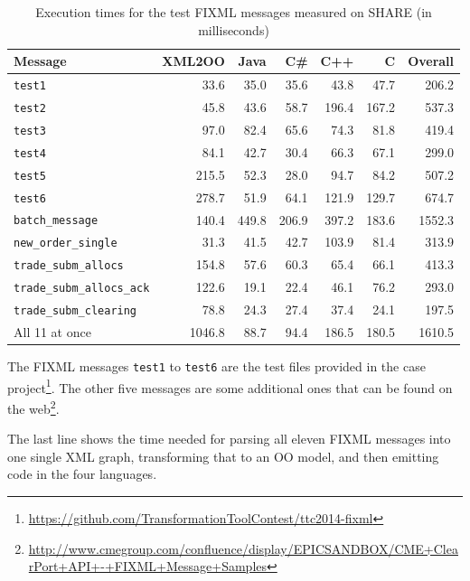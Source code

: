 \documentclass[submission]{eptcs}
\begin{document}
\begin{table}[h!t]
  \centering
  \begin{tabular}{| l | r | r | r | r | r | r |}
    \hline
    \textbf{Message} & \textbf{XML2OO} & \textbf{Java} & \textbf{C\#} & \textbf{C++} & \textbf{C} & \textbf{Overall}\\
    \hline
    \texttt{test1}                    & 33.6  & 35.0  & 35.6  & 43.8 & 47.7 & 206.2\\
    \texttt{test2}                    & 45.8  & 43.6 & 58.7 & 196.4 & 167.2 & 537.3\\
    \texttt{test3}                    & 97.0  & 82.4 & 65.6 & 74.3 & 81.8 & 419.4\\
    \texttt{test4}                    & 84.1  & 42.7 & 30.4 & 66.3 & 67.1 & 299.0\\
    \texttt{test5}                    & 215.5  & 52.3 & 28.0 & 94.7 & 84.2 & 507.2\\
    \texttt{test6}                    & 278.7  & 51.9 & 64.1 & 121.9 & 129.7 & 674.7\\
    \hline
    \texttt{batch\_message}           & 140.4  & 449.8 & 206.9 & 397.2 & 183.6 & 1552.3\\
    \texttt{new\_order\_single}       & 31.3  & 41.5  & 42.7  & 103.9 & 81.4 & 313.9\\
    \texttt{trade\_subm\_allocs}      & 154.8  & 57.6  & 60.3  & 65.4 & 66.1 & 413.3\\
    \texttt{trade\_subm\_allocs\_ack} & 122.6  & 19.1 & 22.4 & 46.1 & 76.2 & 293.0\\
    \texttt{trade\_subm\_clearing}    & 78.8  & 24.3  & 27.4  & 37.4 & 24.1 & 197.5\\
    \hline
    All 11 at once                    & 1046.8 & 88.7 & 94.4 & 186.5 & 180.5 & 1610.5\\
    \hline
  \end{tabular}
  \caption{Execution times for the test FIXML messages measured on SHARE (in milliseconds)}
  \label{tab:exec-times}
\end{table}

The FIXML messages \texttt{test1} to \texttt{test6} are the test files provided
in the case
project\footnote{\url{https://github.com/TransformationToolContest/ttc2014-fixml}}.
The other five messages are some additional ones that can be found on the
web\footnote{\url{http://www.cmegroup.com/confluence/display/EPICSANDBOX/CME+ClearPort+API+-+FIXML+Message+Samples}}.

The last line shows the time needed for parsing all eleven FIXML messages into
one single XML graph, transforming that to an OO model, and then emitting code
in the four languages.
\end{document}
